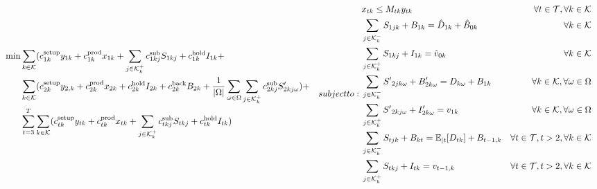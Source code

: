 \documentclass[10pt]{article}
\newcommand{\ti}{t} %
\newcommand{\TI}{\mathcal{T}}
\newcommand{\ka}{k} %
\newcommand{\KA}{\mathcal{K}}
\newcommand{\jey}{j} %
\newcommand{\Es}{S} %
\newcommand{\m}{\omega} %
\newcommand{\Em}{|\Omega|} %
\newcommand{\EM}{\Omega} %
\newcommand{\Csub}{\mathcal{K}^+_k}
\newcommand{\Psub}{\mathcal{K}^-_k}
\begin{document}
\begin{subequations}
\label{mod:ChanceConstraintpolicy}

\begin{flalign}
\min &
\sum_{\ka \in \KA} ( c^{\text{setup}}_{ 1 \ka}y_{ 1 \ka} + c^{\text{prod}}_{ 1 \ka}x_{ 1 \ka}+ \sum_{\jey \in  \Csub}c^{\text{sub}}_{1 \ka \jey} S_{1 \ka \jey}  + c^{\text{hold}}_{ 1 \ka}I_{ 1 \ka} 
+ \notag \\
&\sum_{\ka \in \KA} ( c^{\text{setup}}_{ 2 \ka}y_{2 , \ka} + c^{\text{prod}}_{ 2 \ka}x_{2  \ka}+  c^{\text{hold}}_{2  \ka}I_{2  \ka} + c^{\text{back}}_{2 \ka} {B}_{2  \ka} + \frac{1}{\Em} \sum_{\m \in \EM} \sum_{\jey \in  \Csub} c^{\text{sub}}_{2\ka\jey} \Es'_{2\ka\jey \m} ) + \notag \\
& \sum_{t =3 }^{T} \sum_{\ka \in \KA} ( c^{\text{setup}}_{\ti \ka}y_{\ti \ka} + c^{\text{prod}}_{\ti \ka}x_{\ti \ka}+ \sum_{\jey \in  \Csub}c^{\text{sub}}_{\ti \ka \jey} S_{\ti \ka \jey}  + c^{\text{hold}}_{\ti \ka}I_{\ti \ka}) %
& \label{eq:Sub_Roll_obj_ext} 
\end{flalign}
 subject to:
\begin{flalign}
&x_{\ti \ka} \leq M_{\ti \ka} y_{\ti \ka} &  \forall \ti  \in \TI   ,\forall \ka \in \KA & \label{eq:Sub_FD_Setup}\\
  &  \sum_{\jey \in  \Psub} {S}_{1  \jey \ka} + B_{1 \ka}  = \hat{D}_{1 \ka} + \hat{B}_{0 \ka} &\forall \ka \in \KA  &     \label{eq:Det_backorder_tn}&\\
  &  \sum_{\jey \in  \Csub} {S}_{1 \ka \jey} + I_{ 1 \ka} = \hat{v}_{0  \ka} &\forall \ka \in \KA  &     \label{eq:Det_inventory_tn}&\\
  &  \sum_{\jey \in  \Psub} {S'}_{2 \jey \ka \m} + B'_{2  \ka \m}  = D_{\ka \m} + {B}_{1  \ka} &\forall \ka \in \KA, \forall \m \in \EM &     \label{eq:Det_backorder_tnp}& \\
&  \sum_{\jey \in  \Csub} {S'}_{2 \ka \jey \m} + I'_{2  \ka \m} = v_{1  \ka} &\forall \ka \in \KA, \forall \m \in \EM  &     \label{eq:Det_inventory_tnp}&\\
   &  \sum_{\jey \in  \Psub} {S}_{\ti \jey \ka} + B_{\ka \ti}  = \mathbb{E}_{|\ti}[{D}_{\ti \ka}] + {B}_{\ti -1 ,\ka} &\forall \ti  \in \TI, \ti > 2,\forall \ka \in \KA  &   \label{eq:Det_backorder_ext}& \\
&  \sum_{\jey \in  \Csub} {S}_{\ti \ka \jey} + I_{\ti \ka} = v_{\ti-1 , \ka} &\forall \ti  \in \TI, t > 2,\forall \ka \in \KA  &     \label{eq:Det_inventory_ext}&\\

\end{flalign}
\end{subequations}
\end{document}
